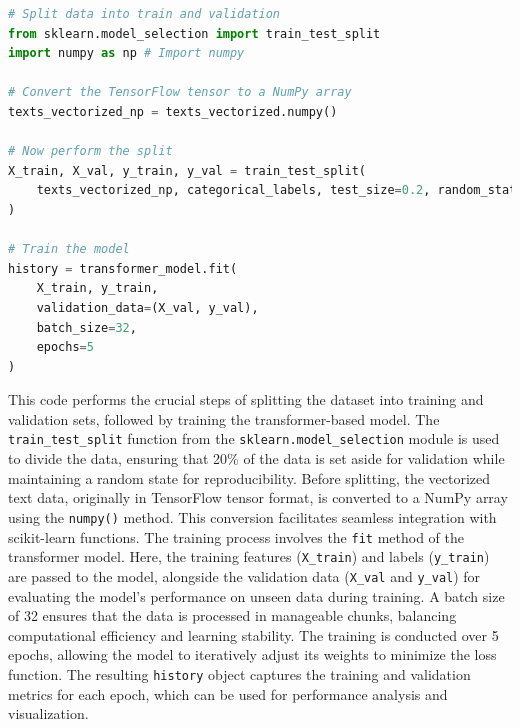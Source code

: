 \begin{tcolorbox}[colback=gray!5!white, colframe=gray!80!black, boxrule=0.5pt, title=Train Transformer Model]
    \begin{lstlisting}[language=Python]
# Split data into train and validation
from sklearn.model_selection import train_test_split
import numpy as np # Import numpy

# Convert the TensorFlow tensor to a NumPy array
texts_vectorized_np = texts_vectorized.numpy()

# Now perform the split
X_train, X_val, y_train, y_val = train_test_split(
    texts_vectorized_np, categorical_labels, test_size=0.2, random_state=42
)

# Train the model
history = transformer_model.fit(
    X_train, y_train,
    validation_data=(X_val, y_val),
    batch_size=32,
    epochs=5
)
    \end{lstlisting}
\end{tcolorbox}

\noindent
This code performs the crucial steps of splitting the dataset into training and validation sets, followed by training the transformer-based model. The \texttt{train\_test\_split} function from the \texttt{sklearn.model\_selection} module is used to divide the data, ensuring that 20\% of the data is set aside for validation while maintaining a random state for reproducibility. Before splitting, the vectorized text data, originally in TensorFlow tensor format, is converted to a NumPy array using the \texttt{numpy()} method. This conversion facilitates seamless integration with scikit-learn functions. The training process involves the \texttt{fit} method of the transformer model. Here, the training features (\texttt{X\_train}) and labels (\texttt{y\_train}) are passed to the model, alongside the validation data (\texttt{X\_val} and \texttt{y\_val}) for evaluating the model's performance on unseen data during training. A batch size of 32 ensures that the data is processed in manageable chunks, balancing computational efficiency and learning stability. The training is conducted over 5 epochs, allowing the model to iteratively adjust its weights to minimize the loss function. The resulting \texttt{history} object captures the training and validation metrics for each epoch, which can be used for performance analysis and visualization.

\pagebreak

